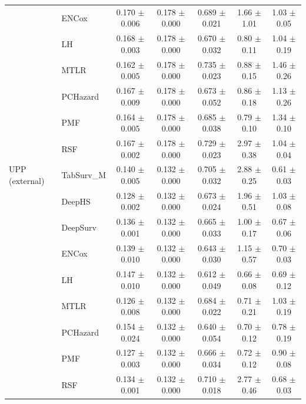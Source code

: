 \begin{longtable}{llccccc}
 & ENCox & 0.170 $\pm$ 0.006 & 0.178 $\pm$ 0.000 & 0.689 $\pm$ 0.021 & 1.66 $\pm$ 1.01 & 1.03 $\pm$ 0.05 \\
 & LH & 0.168 $\pm$ 0.003 & 0.178 $\pm$ 0.000 & 0.670 $\pm$ 0.032 & 0.80 $\pm$ 0.11 & 1.04 $\pm$ 0.19 \\
 & MTLR & 0.162 $\pm$ 0.005 & 0.178 $\pm$ 0.000 & 0.735 $\pm$ 0.023 & 0.88 $\pm$ 0.15 & 1.46 $\pm$ 0.26 \\
 & PCHazard & 0.167 $\pm$ 0.009 & 0.178 $\pm$ 0.000 & 0.673 $\pm$ 0.052 & 0.86 $\pm$ 0.18 & 1.13 $\pm$ 0.26 \\
 & PMF & 0.164 $\pm$ 0.005 & 0.178 $\pm$ 0.000 & 0.685 $\pm$ 0.038 & 0.79 $\pm$ 0.10 & 1.34 $\pm$ 0.10 \\
 & RSF & 0.167 $\pm$ 0.002 & 0.178 $\pm$ 0.000 & 0.729 $\pm$ 0.023 & 2.97 $\pm$ 0.38 & 1.04 $\pm$ 0.04 \\
\midrule
UPP (external) & TabSurv\_M & 0.140 $\pm$ 0.005 & 0.132 $\pm$ 0.000 & 0.705 $\pm$ 0.032 & 2.88 $\pm$ 0.25 & 0.61 $\pm$ 0.03 \\
 & DeepHS & 0.128 $\pm$ 0.002 & 0.132 $\pm$ 0.000 & 0.673 $\pm$ 0.024 & 1.96 $\pm$ 0.51 & 1.03 $\pm$ 0.08 \\
 & DeepSurv & 0.136 $\pm$ 0.001 & 0.132 $\pm$ 0.000 & 0.665 $\pm$ 0.033 & 1.00 $\pm$ 0.17 & 0.67 $\pm$ 0.06 \\
 & ENCox & 0.139 $\pm$ 0.010 & 0.132 $\pm$ 0.000 & 0.643 $\pm$ 0.030 & 1.15 $\pm$ 0.57 & 0.70 $\pm$ 0.03 \\
 & LH & 0.147 $\pm$ 0.010 & 0.132 $\pm$ 0.000 & 0.612 $\pm$ 0.049 & 0.66 $\pm$ 0.08 & 0.69 $\pm$ 0.12 \\
 & MTLR & 0.126 $\pm$ 0.008 & 0.132 $\pm$ 0.000 & 0.684 $\pm$ 0.022 & 0.71 $\pm$ 0.21 & 1.03 $\pm$ 0.19 \\
 & PCHazard & 0.154 $\pm$ 0.024 & 0.132 $\pm$ 0.000 & 0.640 $\pm$ 0.054 & 0.70 $\pm$ 0.12 & 0.78 $\pm$ 0.19 \\
 & PMF & 0.127 $\pm$ 0.003 & 0.132 $\pm$ 0.000 & 0.666 $\pm$ 0.034 & 0.72 $\pm$ 0.12 & 0.90 $\pm$ 0.08 \\
 & RSF & 0.134 $\pm$ 0.001 & 0.132 $\pm$ 0.000 & 0.710 $\pm$ 0.018 & 2.77 $\pm$ 0.46 & 0.68 $\pm$ 0.03 \\
\bottomrule
\end{longtable}
